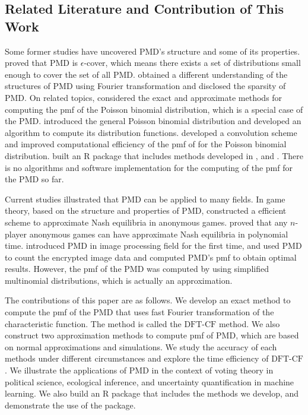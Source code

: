 \documentclass[12pt]{article}
\newcommand{\PMD}{\textrm{PMD}}
\newcommand{\dft}{{\textrm{DFT-CF}}}
\begin{document}
\subsection{Related Literature and Contribution of This Work}

Some former studies have uncovered $\PMD$'s structure and some of its properties.  proved that $\PMD$ is $\epsilon$-cover, which means there exists a set of distributions small enough to cover the set of all $\PMD$.   obtained a different understanding of the structures of $\PMD$ using Fourier transformation and disclosed the sparsity of $\PMD$. On related topics,  considered the exact and approximate methods for computing the pmf of the Poisson binomial distribution, which is a special case of the PMD.  introduced the general Poisson binomial distribution and developed an algorithm to compute its distribution functions.  developed a convolution scheme and improved computational efficiency of the pmf of for the Poisson binomial distribution.  built an R package that includes methods developed in ,  and . There is no algorithms and software implementation for the computing of the pmf for the PMD so far.

Current studies illustrated that $\PMD$ can be applied to many fields. In game theory, based on the structure and properties of $\PMD$,  constructed a efficient scheme to approximate Nash equilibria in anonymous games.  proved that any $n$-player anonymous games can have approximate Nash equilibria in polynomial time.  introduced $\PMD$ in image processing field for the first time, and used $\PMD$ to count the encrypted image data and computed $\PMD$'s pmf to obtain optimal results. However, the pmf of the $\PMD$ was computed by using simplified multinomial distributions, which is actually an approximation.

The contributions of this paper are as follows. We develop an exact method to compute the pmf of the PMD that uses fast Fourier transformation of the characteristic function.  The method is called the $\dft$ method. We also construct two approximation methods to compute pmf of $\PMD$, which are based on normal approximations and simulations. We study the accuracy of each methods under different circumstances and explore the time efficiency of $\dft$. We illustrate the applications of $\PMD$ in the context of voting theory in political science, ecological inference, and uncertainty quantification in machine learning. We also build an R package that includes the methods we develop, and demonstrate the use of the package.
\end{document}
